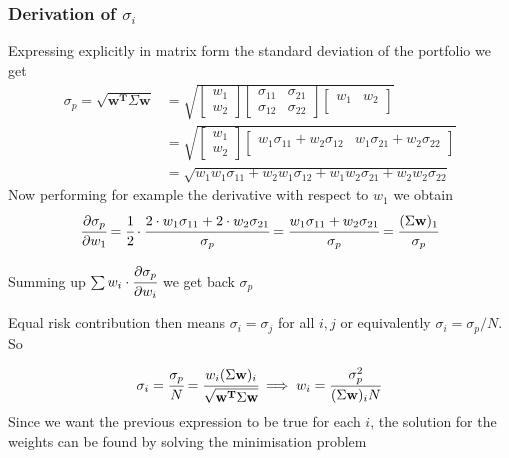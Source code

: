 \begin{attention}
	\subsubsection{Derivation of $\sigma_i$}
	Expressing explicitly in matrix form the standard deviation of the portfolio we get
	\[
	\begin{split}
	\sigma_p={\sqrt {\mathbf{w^T}\Sigma \mathbf{w}}} & =
	\sqrt{
		\begin{bmatrix}
		w_{1} \\
		w_{2}
		\end{bmatrix}
		\begin{bmatrix}
		\sigma_{11} & \sigma_{21} \\
		\sigma_{12} & \sigma_{22} 
		\end{bmatrix}
		\begin{bmatrix}
		w_{1} & w_{2} \\
		\end{bmatrix}
	}\\
	&=
	\sqrt{
		\begin{bmatrix}
		w_{1} \\
		w_{2}
		\end{bmatrix}
		\begin{bmatrix}
		w_{1}\sigma_{11} + w_{2}\sigma_{12} & w_{1}\sigma_{21} + w_{2}\sigma_{22} \\
		\end{bmatrix}
	} \\
	&= \sqrt{
		w_{1}w_{1}\sigma_{11} + w_{2}w_{1}\sigma_{12} + w_{1}w_{2}\sigma_{21} + w_{2}w_{2}\sigma_{22} }
	\end{split}
	\]
	Now performing for example the derivative with respect to $w_1$ we obtain
	\[\cfrac{\partial\sigma_p}{\partial w_1} = \cfrac{1}{2}\cdot\cfrac{2\cdot w_1\sigma_{11} + 2\cdot w_{2}\sigma_{21}}{\sigma_p} = \cfrac{w_1\sigma_{11} + w_{2}\sigma_{21}}{\sigma_p} = \cfrac{(\Sigma \mathbf{w})_{1}}{\sigma_p}\]
	
	Summing up $\sum w_i\cdot\cfrac{\partial\sigma_p}{\partial w_i}$ we get back $\sigma_p$
\end{attention}

Equal risk contribution then means \(\sigma _{i} =\sigma _{j}\) for all \(i,j\) or equivalently \(\sigma _{i}=\sigma_p/N\). So

\begin{equation}
\sigma _{i} = \cfrac{\sigma_p}{N}={\cfrac {w_{i}(\Sigma \mathbf{w})_{i}}{\sqrt {\mathbf{w^T}\Sigma \mathbf{w}}}}\implies w_{i} = \frac {\sigma_p^{2}}{(\Sigma \mathbf{w})_{i}N}
\end{equation}
Since we want the previous expression to be true for each $i$, the solution for the weights can be found by solving the minimisation problem

